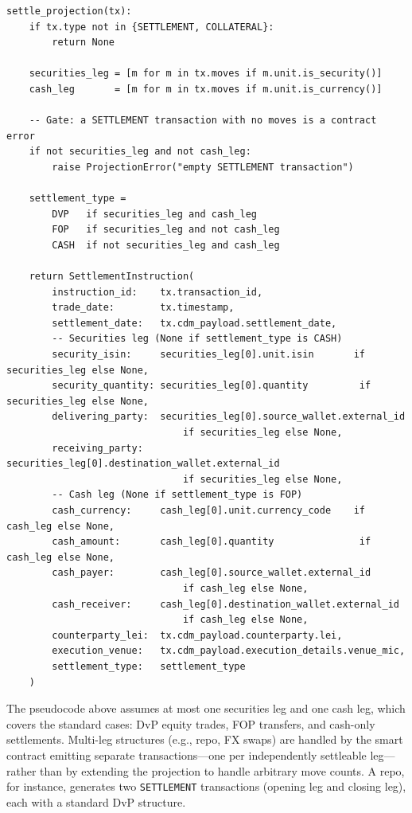 \documentclass[11pt,a4paper]{article}
\begin{document}
\begin{lstlisting}
settle_projection(tx):
    if tx.type not in {SETTLEMENT, COLLATERAL}:
        return None

    securities_leg = [m for m in tx.moves if m.unit.is_security()]
    cash_leg       = [m for m in tx.moves if m.unit.is_currency()]

    -- Gate: a SETTLEMENT transaction with no moves is a contract error
    if not securities_leg and not cash_leg:
        raise ProjectionError("empty SETTLEMENT transaction")

    settlement_type =
        DVP   if securities_leg and cash_leg
        FOP   if securities_leg and not cash_leg
        CASH  if not securities_leg and cash_leg

    return SettlementInstruction(
        instruction_id:    tx.transaction_id,
        trade_date:        tx.timestamp,
        settlement_date:   tx.cdm_payload.settlement_date,
        -- Securities leg (None if settlement_type is CASH)
        security_isin:     securities_leg[0].unit.isin       if securities_leg else None,
        security_quantity: securities_leg[0].quantity         if securities_leg else None,
        delivering_party:  securities_leg[0].source_wallet.external_id
                               if securities_leg else None,
        receiving_party:   securities_leg[0].destination_wallet.external_id
                               if securities_leg else None,
        -- Cash leg (None if settlement_type is FOP)
        cash_currency:     cash_leg[0].unit.currency_code    if cash_leg else None,
        cash_amount:       cash_leg[0].quantity               if cash_leg else None,
        cash_payer:        cash_leg[0].source_wallet.external_id
                               if cash_leg else None,
        cash_receiver:     cash_leg[0].destination_wallet.external_id
                               if cash_leg else None,
        counterparty_lei:  tx.cdm_payload.counterparty.lei,
        execution_venue:   tx.cdm_payload.execution_details.venue_mic,
        settlement_type:   settlement_type
    )
\end{lstlisting}

\noindent The pseudocode above assumes at most one securities leg and one cash leg, which covers the standard cases: DvP equity trades, FOP transfers, and cash-only settlements. Multi-leg structures (e.g., repo, FX swaps) are handled by the smart contract emitting separate transactions---one per independently settleable leg---rather than by extending the projection to handle arbitrary move counts. A repo, for instance, generates two \texttt{SETTLEMENT} transactions (opening leg and closing leg), each with a standard DvP structure.
\end{document}
